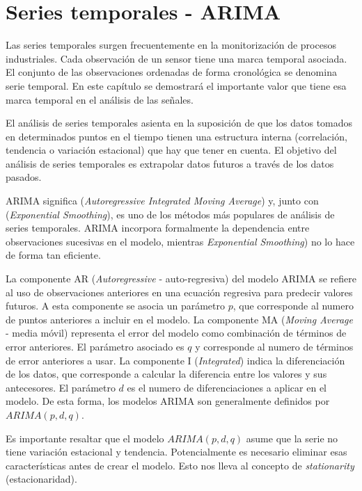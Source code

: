 \documentclass[11pt,spanish,listoffigures,listoftables]{tfgetsinf}
\begin{document}
    \section{Series temporales - ARIMA}
    Las series temporales surgen frecuentemente en la monitorización de procesos industriales. Cada observación de un sensor tiene una marca temporal asociada. El conjunto de las observaciones ordenadas de forma cronológica se denomina serie temporal. En este capítulo se demostrará el importante valor que tiene esa marca temporal en el análisis de las señales. 
    
    El análisis de series temporales asienta en la suposición de que los datos tomados en determinados puntos en el tiempo tienen una estructura interna (correlación, tendencia o variación estacional) que hay que tener en cuenta. El objetivo del análisis de series temporales es extrapolar datos futuros a través de los datos pasados. 
    
    ARIMA significa ({\em Autoregressive Integrated Moving Average}) y, junto con ({\em Exponential Smoothing}), es uno de los métodos más populares de análisis de series temporales. ARIMA incorpora formalmente la dependencia entre observaciones sucesivas en el modelo, mientras {\em Exponential Smoothing}) no lo hace de forma tan eficiente.
    
    La componente AR ({\em Autoregressive} - auto-regresiva) del modelo ARIMA se refiere al uso de observaciones anteriores en una ecuación regresiva para predecir valores futuros. A esta componente se asocia un parámetro \(p\), que corresponde al numero de puntos anteriores a incluir en el modelo. La componente MA ({\em Moving Average} - media móvil) representa el error del modelo como combinación de términos de error anteriores. El parámetro asociado es \(q\) y corresponde al numero de términos de error anteriores a usar. La componente I ({\em Integrated}) indica la diferenciación de los datos, que corresponde a calcular la diferencia entre los valores y sus antecesores. El parámetro \(d\) es el numero de diferenciaciones a aplicar en el modelo. De esta forma, los modelos ARIMA son generalmente definidos por \(ARIMA(p, d, q)\).
    
    Es importante resaltar que el modelo \(ARIMA(p, d, q)\) asume que la serie no tiene variación estacional y tendencia. Potencialmente es necesario eliminar esas características antes de crear el modelo. Esto nos lleva al concepto de {\em stationarity} (estacionaridad).
    
\end{document}
